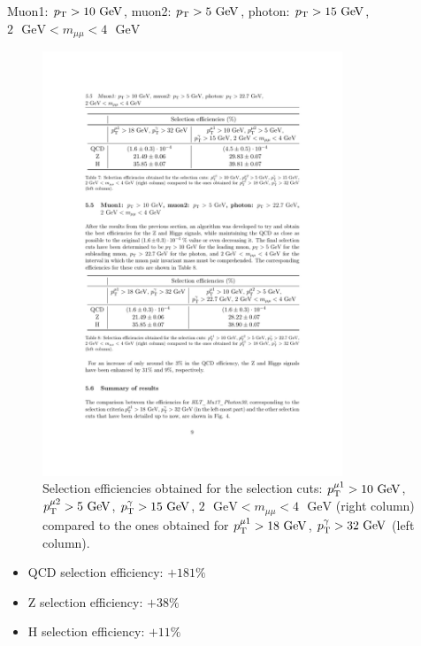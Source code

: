 \documentclass[aspectratio = 1610, xcolor = dvipsnames]{beamer}
\newcommand{\GeV}{\textrm{ }\mathrm{GeV}}
\newcommand{\pt}{p_{\rm T}}
\newcommand{\red}{\textcolor{unipd}}
\begin{document}

    \begin{frame}[t]{Muon1: $\pt > 10\GeV$, muon2: $\pt > 5\GeV$, photon: $\pt>15\GeV$, $2\GeV<m_{\mu\mu}<4\GeV$}
        
        \begin{figure}[c]
            \centering
            \includegraphics[width=0.8\textwidth]{images/Mu10_Mu05_Ph15_2mumuM4_table.pdf}
            \caption{Selection efficiencies obtained for the selection cuts: $\pt^{\mu 1} > 10\GeV$, $\pt^{\mu 2} > 5\GeV$, $\pt^{\gamma} > 15\GeV$, $2\GeV < m_{\mu\mu} < 4\GeV$ (right column) compared to the ones obtained for $\pt^{\mu 1} > 18\GeV$, $\pt^{\gamma} > 32\GeV$ (left column).
            \label{im:Mu10_Mu05_Ph15_2mumuM4_table}}
        \end{figure}
        
        \begin{itemize}
            \item QCD selection efficiency: \red{$ + 181\%$}
            \item Z selection efficiency: \red{$ + 38\%$}
            \item H selection efficiency: \red{$ + 11\%$}
        \end{itemize}

    \end{frame}
    
\end{document}
